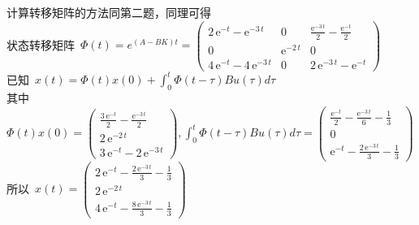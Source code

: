 \documentclass[a4paper]{article}
\begin{document}
计算转移矩阵的方法同第二题，同理可得\\
\mbox{状态转移矩阵 }$ \Phi(t)=e^{(A-BK)t}=\left(\begin{array}{ccc} 2\, \mathrm{e}^{- t} - \mathrm{e}^{- 3\, t} & 0 & \frac{\mathrm{e}^{- 3\, t}}{2} - \frac{\mathrm{e}^{- t}}{2}\\ 0 & \mathrm{e}^{- 2\, t} & 0\\ 4\, \mathrm{e}^{- t} - 4\, \mathrm{e}^{- 3\, t} & 0 & 2\, \mathrm{e}^{- 3\, t} - \mathrm{e}^{- t} \end{array}\right) $\\
\mbox{已知 }$x(t)=\Phi(t)x(0)+\int_{0}^{t}\Phi(t-\tau)Bu(\tau)d\tau $ \\
\mbox{其中 }$\Phi(t)x(0)=\left(\begin{array}{c} \frac{3\, \mathrm{e}^{- t}}{2} - \frac{\mathrm{e}^{- 3\, t}}{2}\\ 2\, \mathrm{e}^{- 2\, t}\\ 3\, \mathrm{e}^{- t} - 2\, \mathrm{e}^{- 3\, t} \end{array}\right),
\int_{0}^{t}\Phi(t-\tau)Bu(\tau)d\tau=\left(\begin{array}{c} \frac{\mathrm{e}^{- t}}{2} - \frac{\mathrm{e}^{- 3\, t}}{6} - \frac{1}{3}\\ 0\\ \mathrm{e}^{- t} - \frac{2\, \mathrm{e}^{- 3\, t}}{3} - \frac{1}{3} \end{array}\right) $ \\
\mbox{所以 }$x(t)=\left(\begin{array}{c} 2\, \mathrm{e}^{- t} - \frac{2\, \mathrm{e}^{- 3\, t}}{3} - \frac{1}{3}\\ 2\, \mathrm{e}^{- 2\, t}\\ 4\, \mathrm{e}^{- t} - \frac{8\, \mathrm{e}^{- 3\, t}}{3} - \frac{1}{3} \end{array}\right)$ \\
\end{document}
